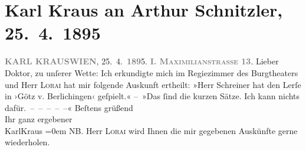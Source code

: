 

         
         \newcommand{\erwaehntePersonen}{Personen: Christian Lorey, Jakob Schreiner}
         \newcommand{\erwaehnteInstitutionen}{}
         \newcommand{\erwaehnteOrte}{Orte: Burgtheater, Mahlerstraße, Wien}
         \newcommand{\erwaehnteWerke}{Werke: Götz von Berlichingen}
               \section[Karl Kraus an Arthur Schnitzler, 25. 4. 1895]{ Karl Kraus an Arthur Schnitzler, 25. 4. 1895}\nopagebreak{}\rehead{ }\begin{ledgroupsized}[t]{13cm}\normalsize\beginnumbering \toendnotes[C]{\smallbreak\pagebreak[2]} 
\toendnotes[C]{\smallbreak}\pstart
           \noindent{}{\pb}\textcolor{gray}{\textbf{KARL KRAUS}}\hfill \textcolor{gray}{\textbf{WIEN}}, 25. 4. \textcolor{gray}{\textbf{189}}5.\pend
           \pstart
           \raggedleft{}\textcolor{gray}{\textbf{\textsc{I. Maximilianstrasse 13}}}.\pend
           \pstart{}Lieber Doktor,\pend\pstart
           zu unſerer Wette:\pend
           \pstart
           Ich erkundigte mich im Regiezimmer des Burgtheaters und Herr \textsc{Lorai} hat mir folgende Auskunft
                    ertheilt:\pend
           \pstart
           »Herr Schreiner hat den Lerſe in ›Götz v.
                        Berlichingen‹ 
                    geſpielt.«\pend
           \pstart
           – »Das ſind die kurzen Sätze. Ich kann nichts dafür. – – – – –«\pend
           \pstart
           Beſtens grüßend{\\[\baselineskip]}Ihr ganz ergebener{\\[\baselineskip]}\spacefill\mbox{KarlKraus}\pend
           \leftskip=0em{}\pstart
           \noindent{}\textsc{NB}. Herr \textsc{Lorai} wird Ihnen die mir gegebenen
                        Auskünfte gerne wiederholen.\pend
           
         
         \endnumbering{}\end{ledgroupsized}  \newcommand{\dateiname}{L00432}\newcommand{\titel}{Karl Kraus an Arthur Schnitzler, 25. 4. 1895}\newcommand{\editorInnen}{Martin Anton Müller und Gerd-Hermann Susen}
      